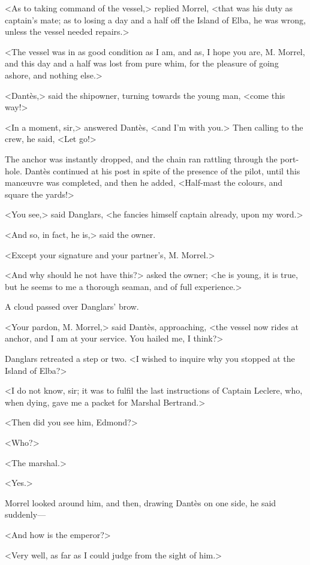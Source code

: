  <As to taking command of the vessel,> replied Morrel, <that was his duty as captain's mate; as to losing a day and a half off the Island of Elba, he was wrong, unless the vessel needed repairs.> 

 <The vessel was in as good condition as I am, and as, I hope you are, M. Morrel, and this day and a half was lost from pure whim, for the pleasure of going ashore, and nothing else.> 

 <Dantès,> said the shipowner, turning towards the young man, <come this way!> 

 <In a moment, sir,> answered Dantès, <and I'm with you.> Then calling to the crew, he said, <Let go!> 

 The anchor was instantly dropped, and the chain ran rattling through the port-hole. Dantès continued at his post in spite of the presence of the pilot, until this manœuvre was completed, and then he added, <Half-mast the colours, and square the yards!> 

 <You see,> said Danglars, <he fancies himself captain already, upon my word.> 

 <And so, in fact, he is,> said the owner. 

 <Except your signature and your partner's, M. Morrel.> 

 <And why should he not have this?> asked the owner; <he is young, it is true, but he seems to me a thorough seaman, and of full experience.> 

 A cloud passed over Danglars' brow. 

 <Your pardon, M. Morrel,> said Dantès, approaching, <the vessel now rides at anchor, and I am at your service. You hailed me, I think?> 

 Danglars retreated a step or two. <I wished to inquire why you stopped at the Island of Elba?> 

 <I do not know, sir; it was to fulfil the last instructions of Captain Leclere, who, when dying, gave me a packet for Marshal Bertrand.> 

 <Then did you see him, Edmond?> 

 <Who?> 

 <The marshal.> 

 <Yes.> 

 Morrel looked around him, and then, drawing Dantès on one side, he said suddenly— 

 <And how is the emperor?> 

 <Very well, as far as I could judge from the sight of him.> 

